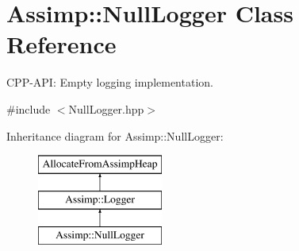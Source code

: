 \hypertarget{class_assimp_1_1_null_logger}{}\section{Assimp\+:\+:Null\+Logger Class Reference}
\label{class_assimp_1_1_null_logger}


C\+P\+P-\/\+A\+PI\+: Empty logging implementation.  




{\ttfamily \#include $<$Null\+Logger.\+hpp$>$}

Inheritance diagram for Assimp\+:\+:Null\+Logger\+:\begin{figure}[H]
\begin{center}
\leavevmode
\includegraphics[height=3.000000cm]{class_assimp_1_1_null_logger}
\end{center}
\end{figure}

